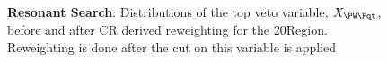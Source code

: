 {	\begin{figure}[ht]
	    \centering
	    \caption{\textbf{Resonant Search}: Distributions of the top veto variable, $X_{\PW\Pqt}$, before and after CR derived reweighting for the 20\yr\space \region\space Region. Reweighting is done after the cut on this variable is applied}
	    \label{fig:res-\region-NN\yr-8}
	\end{figure}
}
